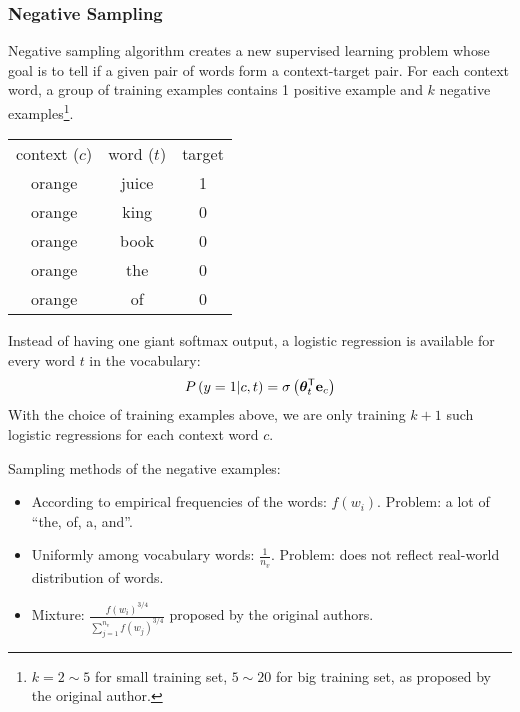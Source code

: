\subsubsection{Negative Sampling}
Negative sampling algorithm creates a new supervised learning problem whose goal is to tell if a given pair of words form a context-target pair. For each context word, a group of training examples contains 1 positive example and $k$ negative examples\footnote{$k=2\sim 5$ for small training set, $5\sim20$ for big training set, as proposed by the original author.}.
\begin{center}
  \begin{tabular}{ccc}
    context ($c$) & word ($t$) & target \\
    orange & juice & 1\\
    orange & king & 0\\
    orange & book & 0\\
    orange & the & 0\\
    orange & of & 0
  \end{tabular}
\end{center}
Instead of having one giant softmax output, a logistic regression is available for every word $t$ in the vocabulary:
\begin{align*}
  P\left(y=1|c,t\right)=\sigma\left(\mathbf{\boldsymbol{\theta}}_{t}^{\mathsf{T}}\mathbf{e}_{c}\right)
\end{align*}
With the choice of training examples above, we are only training $k+1$ such logistic regressions for each context word $c$.

Sampling methods of the negative examples:
\begin{itemize}
  \item According to empirical frequencies of the words: $f\left(w_i\right)$. Problem: a lot of ``the, of, a, and''.
  \item Uniformly among vocabulary words: $\frac{1}{n_v}$. Problem: does not reflect real-world distribution of words.
  \item Mixture: $\frac{f\left(w_i\right)^{3/4}}{\sum_{j=1}^{n_v}f\left(w_j\right)^{3/4}}$ proposed by the original authors.
\end{itemize}
